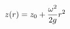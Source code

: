 \documentclass[preview]{standalone}
\begin{document}
\begin{align*}
\special{dvisvgm:raw <g id='unique000'>}z(r) = z_0 + \frac{\omega^2}{2g} r^2\special{dvisvgm:raw </g>}
\end{align*}
\end{document}
